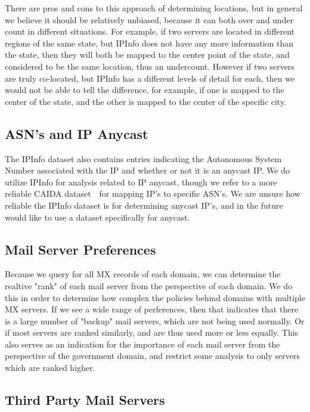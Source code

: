 \documentclass{hotnets21}
\begin{document}
There are pros and cons to this approach of determining locations, but in general we believe it should be relatively unbiased, because it can both over and under count in different situations.
For example, if two servers are located in different regions of the same state, but IPInfo does not have any more information than the state, then they will both be mapped to the center point of the state, and considered to be the same location, thus an undercount.
However if two servers are truly co-located, but IPInfo has a different levels of detail for each, then we would not be able to tell the difference, for example, if one is mapped to the center of the state, and the other is mapped to the center of the specific city.

\subsection{ASN's and IP Anycast}

The IPInfo dataset also contains entries indicating the Autonomous System Number associated with the IP and whether or not it is an anycast IP.
We do utilize IPInfo for analysis related to IP anycast, though we refer to a more reliable CAIDA dataset~\cite{caidaiptoasn}~for mapping IP's to specific ASN's.
We are unsure how reliable the IPInfo dataset is for determining anycast IP's, and in the future would like to use a dataset specifically for anycast.

\subsection{Mail Server Preferences}

Because we query for all MX records of each domain, we can determine the realtive "rank" of each mail server from the perspective of each domain.
We do this in order to determine how complex the policies behind domains with multiple MX servers.
If we see a wide range of perferences, then that indicates that there is a large number of "backup" mail servers, which are not being used normally.
Or if most servers are ranked similarly, and are thus used more or less equally.
This also serves as an indication for the importance of each mail server from the perspective of the government domain, and restrict some analysis to only servers which are ranked higher.

\subsection{Third Party Mail Servers}
\end{document}
